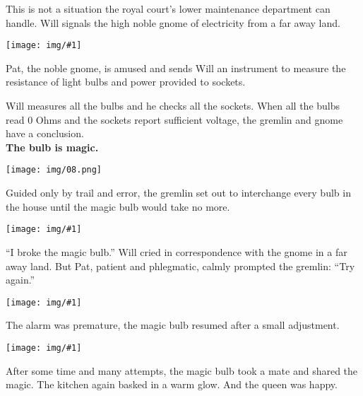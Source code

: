 \documentclass[extrafontsizes,20pt]{memoir}
\newcommand\img[1]{\begin{center}\vspace*{\fill}\texttt{[image: img/\#1]}\vspace*{\fill}\end{center}}
\newcommand\emptypage{\null\newpage}
\begin{document}
\newpage
This is not a situation the royal court's lower maintenance department can handle.
Will signals the high noble gnome of electricity from a far away land.
\img{07}
Pat, the noble gnome, is amused and sends Will an instrument to measure the resistance of light bulbs and power provided to sockets.

\newpage
Will measures all the bulbs and he checks all the sockets. When all the bulbs read 0 Ohms and the sockets report sufficient voltage, the gremlin and gnome have a conclusion.\\

\noindent\textbf{\large The bulb is magic.}
\vspace*{\fill}
\begin{center}\texttt{[image: img/08.png]}\end{center}
\vspace*{\fill}

\newpage
Guided only by trail and error, the gremlin set out to interchange every bulb in the house until the magic bulb would take no more.
\img{09}

\newpage
``I broke the magic bulb.'' Will cried in correspondence with the gnome in a far away land. But Pat, patient and phlegmatic, calmly prompted the gremlin: ``Try again.'' 

\img{10}

\newpage
The alarm was premature, the magic bulb resumed after a small adjustment. \\
\img{11}
After some time and many attempts, the magic bulb took a mate and shared the magic. The kitchen again basked in a warm glow. And the queen was happy.


\emptypage{}
\emptypage{}
\emptypage{}
\emptypage{}
\emptypage{}
\emptypage{}
\end{document}
